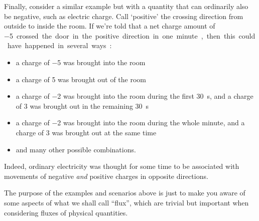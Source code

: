 \documentclass[a4paper,12pt,%
onecolumn,oneside,titlepage,%
british%
]{memoir}
\renewcommand*{\|}[1][]{\nonscript\:#1\vert\nonscript\:\mathopen{}}
\begin{document}
Finally, consider a similar example but with a quantity that can ordinarily also be negative, such as electric charge. Call \enquote*{positive} the crossing direction from outside to inside the room. If we're told that a net charge amount of \qty{-5} crossed the door in the positive direction in one minute, then this could have happened in several ways:
\begin{itemize}[nosep]
\item a charge of \num{-5} was brought into the room
\item a charge of \num{+5} was brought out of the room
\item a charge of \num{-2} was brought into the room during the first \qty{30}{s}, and a charge of \num{+3} was brought out in the remaining \qty{30}{s}
\item a charge of \num{-2} was brought into the room during the whole minute, and a charge of \num{+3} was brought out at the same time
\item \textellipsis and many other possible combinations.
\end{itemize}
%
Indeed, ordinary electricity was  thought for some time to be associated with movements of negative \emph{and} positive charges in opposite directions.

\smallskip

The purpose of the examples and scenarios above is just to make you aware of some  aspects of what we shall call \enquote{flux}, which are trivial but important when considering fluxes of physical quantities.
\end{document}
